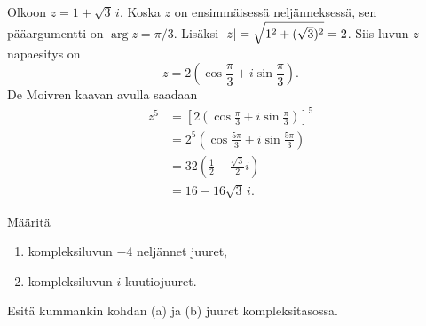 \documentclass[11pt,a4paper]{amsart}
\begin{document}
\begin{solution}
Olkoon \(z=1+\sqrt{3}\,i\). Koska \(z\) on ensimmäisessä neljänneksessä,
sen pääargumentti on \(\arg z=\pi/3\). Lisäksi
\(\lvert z\rvert=\sqrt{1^2+(\sqrt{3})^2}=2\). Siis luvun \(z\) napaesitys on
\[
z=2\left(\cos\frac{\pi}{3}+i\sin\frac{\pi}{3}\right).
\]
De Moivren kaavan avulla saadaan
\[
\begin{aligned}
z^5
&=\left[2\left(\cos\frac{\pi}{3}+i\sin\frac{\pi}{3}\right)\right]^5 \\
&=2^5\left(\cos\frac{5\pi}{3}+i\sin\frac{5\pi}{3}\right) \\
&=32\left(\frac{1}{2}-\frac{\sqrt{3}}{2}i\right) \\
&=16-16\sqrt{3}\,i.
\end{aligned}
\]
\end{solution}

\begin{exercise}
Määritä
\begin{enumerate}[label=\alph*), nosep]
\item kompleksiluvun \(-4\) neljännet juuret,
\item kompleksiluvun \(i\) kuutiojuuret.
\end{enumerate}
Esitä kummankin kohdan (a) ja (b) juuret kompleksitasossa.
\end{exercise}
\end{document}
